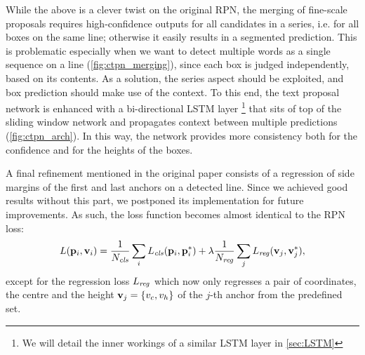 		While the above is a clever twist on the original RPN, the merging of fine-scale proposals requires high-confidence outputs for all candidates in a series, i.e. for all boxes on the same line; otherwise it easily results in a segmented prediction. This is problematic especially when we want to detect multiple words as a single sequence on a line (\autoref{fig:ctpn_merging}), since each box is judged independently, based on its contents. As a solution, the series aspect should be exploited, and box prediction should make use of the context. To this end, the text proposal network is enhanced with a bi-directional LSTM layer
			\footnote{We will detail the inner workings of a similar LSTM layer in \autoref{sec:LSTM}}
		that sits of top of the sliding window network and propagates context between multiple predictions (\autoref{fig:ctpn_arch}). In this way, the network provides more consistency both for the confidence and for the heights of the boxes.

		A final refinement mentioned in the original paper consists of a regression of side margins of the first and last anchors on a detected line. Since we achieved good results without this part, we postponed its implementation for future improvements. As such, the loss function becomes almost identical to the RPN loss:
		\begin{equation*}\label{eq:ctpn_loss}
		L(\mathbf{p}_i, \mathbf{v}_i) =
			\frac{1}{N_{\mathit{cls}}}\sum_i L_{\mathit{cls}}(\mathbf{p}_i, \mathbf{p}^{*}_i)
			+ \lambda\frac{1}{N_{\mathit{reg}}}\sum_j L_{\mathit{reg}}(\mathbf{v}_j, \mathbf{v}^{*}_j),
		\end{equation*}
		except for the regression loss \(L_{\mathit{reg}}\) which now only regresses a pair of coordinates, the centre and the height \(\mathbf{v}_j = \{v_c, v_h\}\) of the \(j\)-th anchor from the predefined set.


